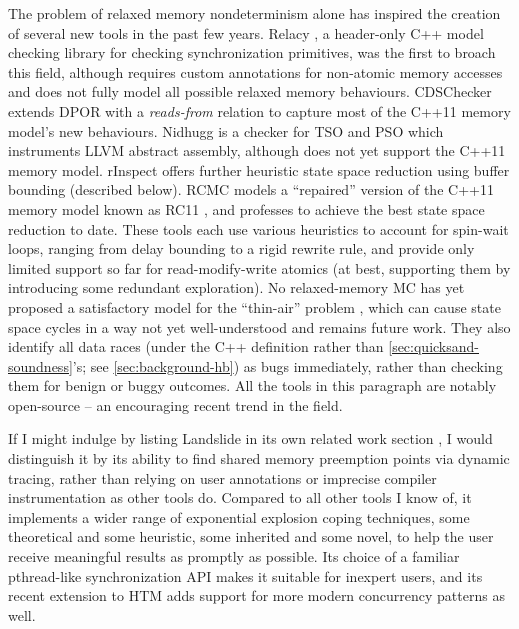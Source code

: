The problem of relaxed memory nondeterminism alone has inspired the creation of several new tools in the past few years.
Relacy \cite{relacy}, a header-only C++ model checking library for checking synchronization primitives,
was the first to broach this field,
although  requires custom annotations for non-atomic memory accesses
and
does not fully model all possible relaxed memory behaviours.
CDSChecker \cite{cdschecker} extends DPOR with a {\em reads-from} relation
to capture most of the C++11 memory model's new behaviours.
Nidhugg \cite{nidhugg} is a checker for TSO and PSO which instruments LLVM abstract assembly,
although does not yet support the C++11 memory model.
rInspect \cite{tsopso}
offers further heuristic state space reduction using buffer bounding (described below).
RCMC \cite{rcmc} models a ``repaired'' version of the C++11 memory model known as RC11 \cite{rc11},
and professes to achieve the best state space reduction to date.
These tools each use various heuristics to account for spin-wait loops,
ranging from delay bounding \cite{bpor} to a rigid rewrite rule,
and provide only limited support so far for read-modify-write atomics
(at best, supporting them by introducing %
some redundant exploration).
%
No relaxed-memory MC has yet proposed a satisfactory model for the ``thin-air'' problem \cite{sully-thesis},
which can cause state space cycles in a way not yet well-understood and remains future work.
They also identify all data races
(under the C++ definition rather than \cref{sec:quicksand-soundness}'s; see \cref{sec:background-hb})
as bugs immediately, rather than checking them for benign or buggy outcomes.
All the tools in this paragraph are notably open-source -- an encouraging recent trend in the field.

If I might indulge by listing Landslide in its own related work section \cite{this-thesis},
I would distinguish it by its ability to find shared memory preemption points via dynamic tracing,
rather than relying on user annotations or imprecise compiler instrumentation
as other tools do.
Compared to all other tools I know of,
it implements a wider range of exponential explosion coping techniques,
some theoretical and some heuristic,
some inherited and some novel,
to help the user receive meaningful results as promptly as possible.
Its choice of a familiar pthread-like synchronization API makes it suitable for inexpert users,
and its recent extension to HTM adds support for more modern concurrency patterns as well.

